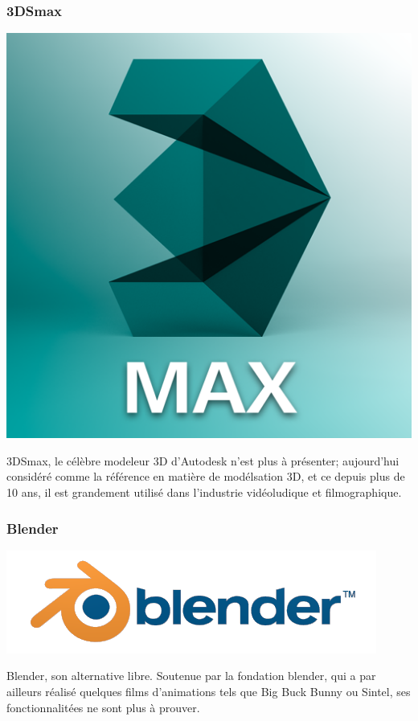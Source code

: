 	\subsubsection{3DSmax}
		\noindent\begin{minipage}{0.3\textwidth}
			\includegraphics[width=\linewidth]{1-PreEtude/img/3dsmax_logo}
			\end{minipage}
			\hfill
			\begin{minipage}{0.6\textwidth}\raggedleft
			3DSmax, le célèbre modeleur 3D d’Autodesk n’est plus à présenter; aujourd’hui considéré comme la référence en matière de modélsation 3D, et ce depuis plus de 10 ans, il est grandement utilisé dans l’industrie vidéoludique et filmographique.
		\end{minipage}
		
	
	\subsubsection{Blender}
		\noindent\begin{minipage}{0.3\textwidth}
			\includegraphics[width=\linewidth]{1-PreEtude/img/blender_logo}
			\end{minipage}
			\hfill
			\begin{minipage}{0.6\textwidth}\raggedleft
			Blender, son alternative libre. Soutenue par la fondation blender, qui a par ailleurs réalisé quelques films d’animations tels que Big Buck Bunny ou Sintel, ses fonctionnalitées ne sont plus à prouver.
		\end{minipage}
		
